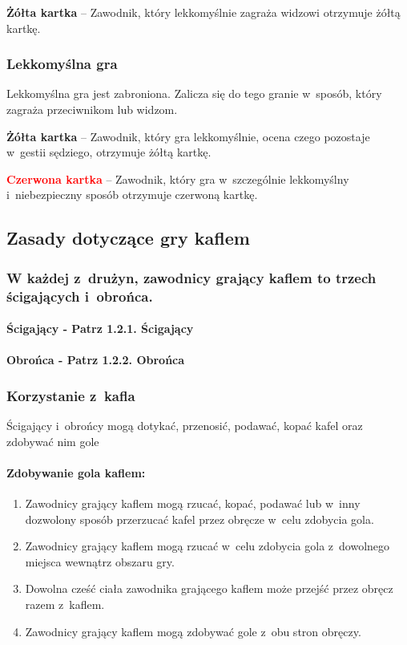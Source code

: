 \documentclass[12pt]{article}
\newcommand\redcard[1]{\bgroup\textcolor{red}{\textbf{#1}}}
\newcommand\yellowcard[1]{\bgroup\textcolor{darkyellow}{\textbf{#1}}}
\begin{document}
\yellowcard{Żółta kartka} -- Zawodnik, który lekkomyślnie zagraża widzowi
otrzymuje żółtą kartkę.

\subsubsection{Lekkomyślna gra}

Lekkomyślna gra jest zabroniona. Zalicza się do tego granie w~sposób,
który zagraża przeciwnikom lub widzom.

\yellowcard{Żółta kartka} -- Zawodnik, który gra lekkomyślnie, ocena czego
pozostaje w~gestii sędziego, otrzymuje żółtą kartkę.

\redcard{Czerwona kartka} -- Zawodnik, który gra w~szczególnie lekkomyślny i~niebezpieczny sposób otrzymuje czerwoną kartkę.

\subsection{Zasady dotyczące gry kaflem}

\subsubsection{W każdej z~drużyn, zawodnicy grający kaflem to trzech ścigających
 i~obrońca.}

\paragraph{Ścigający - Patrz 1.2.1. Ścigający}

\paragraph{Obrońca - Patrz 1.2.2. Obrońca}

\subsubsection{Korzystanie z~kafla}

Ścigający i~obrońcy mogą dotykać, przenosić, podawać, kopać kafel oraz
zdobywać nim gole

\paragraph{Zdobywanie gola kaflem:}

\begin{enumerate}
	\item
	      Zawodnicy grający kaflem mogą rzucać, kopać, podawać lub w~inny
	      dozwolony sposób przerzucać kafel przez obręcze w~celu zdobycia gola.
	\item
	      Zawodnicy grający kaflem mogą rzucać w~celu zdobycia gola z~dowolnego
	      miejsca wewnątrz obszaru gry.
	\item
	      Dowolna cześć ciała zawodnika grającego kaflem może przejść przez
	      obręcz razem z~kaflem.
	\item
	      Zawodnicy grający kaflem mogą zdobywać gole z~obu stron obręczy.
\end{enumerate}
\end{document}
